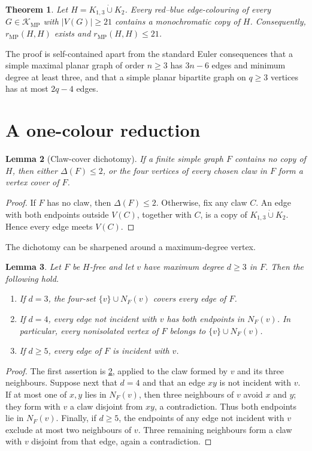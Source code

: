 \documentclass[11pt]{article}
\newtheorem{theorem}{Theorem}
\newtheorem{lemma}[theorem]{Lemma}
\newcommand{\MP}{\mathrm{MP}}
\newcommand{\cK}{\mathcal{K}}
\newcommand{\sqcupdot}{\mathbin{\dot\cup}}
\begin{document}
\begin{theorem}\label{thm:main}
Let $H=K_{1,3}\sqcupdot K_2$.  Every red--blue edge-colouring of every
$G\in\cK_{\MP}$ with $|V(G)|\geq21$ contains a monochromatic copy of $H$.
Consequently, $r_{\MP}(H,H)$ exists and $r_{\MP}(H,H)\leq21$.
\end{theorem}

The proof is self-contained apart from the standard Euler consequences that
a simple maximal planar graph of order $n\geq3$ has $3n-6$ edges and
minimum degree at least three, and that a simple planar bipartite graph on
$q\geq3$ vertices has at most $2q-4$ edges.

\section{A one-colour reduction}

\begin{lemma}[Claw-cover dichotomy]\label{lem:dichotomy}
If a finite simple graph $F$ contains no copy of $H$, then either
$\Delta(F)\leq2$, or the four vertices of every chosen claw in $F$ form a
vertex cover of $F$.
\end{lemma}

\begin{proof}
If $F$ has no claw, then $\Delta(F)\leq2$.  Otherwise, fix any claw $C$.
An edge with both endpoints outside $V(C)$, together with $C$, is a copy of
$K_{1,3}\sqcupdot K_2$.  Hence every edge meets $V(C)$.
\end{proof}

The dichotomy can be sharpened around a maximum-degree vertex.

\begin{lemma}\label{lem:maxdegree}
Let $F$ be $H$-free and let $v$ have maximum degree $d\geq3$ in $F$.
Then the following hold.
\begin{enumerate}
  \item If $d=3$, the four-set $\{v\}\cup N_F(v)$ covers every edge of
  $F$.
  \item If $d=4$, every edge not incident with $v$ has both endpoints in
  $N_F(v)$.  In particular, every nonisolated vertex of $F$ belongs to
  $\{v\}\cup N_F(v)$.
  \item If $d\geq5$, every edge of $F$ is incident with $v$.
\end{enumerate}
\end{lemma}

\begin{proof}
The first assertion is \cref{lem:dichotomy}, applied to the claw formed by
$v$ and its three neighbours.  Suppose next that $d=4$ and that an edge
$xy$ is not incident with $v$.  If at most one of $x,y$ lies in $N_F(v)$,
then three neighbours of $v$ avoid $x$ and $y$; they form with $v$ a claw
disjoint from $xy$, a contradiction.  Thus both endpoints lie in $N_F(v)$.
Finally, if $d\geq5$, the endpoints of any edge not incident with $v$
exclude at most two neighbours of $v$.  Three remaining neighbours form a
claw with $v$ disjoint from that edge, again a contradiction.
\end{proof}
\end{document}
